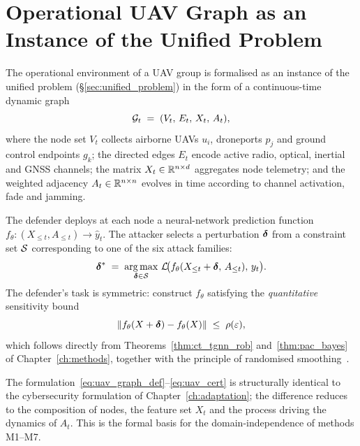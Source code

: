 \section{Operational UAV Graph as an Instance of the Unified Problem}
\label{sec:uav_graph}

The operational environment of a UAV group is formalised as an
instance of the unified problem
(\S\ref{sec:unified_problem}) in the form of a continuous-time
dynamic graph
\begin{equation}
\mathcal{G}_t \;=\; (V_t,\,E_t,\,X_t,\,A_t),
\label{eq:uav_graph_def}
\end{equation}
where the node set $V_t$ collects airborne UAVs $u_i$, droneports
$p_j$ and ground control endpoints $g_k$; the directed edges $E_t$
encode active radio, optical, inertial and GNSS channels; the matrix
$X_t \in \mathbb{R}^{n\times d}$ aggregates node telemetry; and the weighted
adjacency $A_t \in \mathbb{R}^{n\times n}$ evolves in time according to
channel activation, fade and jamming.

The defender deploys at each node a neural-network prediction
function $f_{\theta}\colon (X_{\le t},A_{\le t}) \to \hat{y}_t$. The
attacker selects a perturbation $\boldsymbol{\delta}$ from a constraint set
$\mathcal{S}$ corresponding to one of the six attack families:
\begin{equation}
\boldsymbol{\delta}^{*} \;=\; \mathop{\mathrm{arg\,max}}_{\boldsymbol{\delta}\in\mathcal{S}}\,
\mathcal{L}\!\bigl(f_{\theta}(X_{\le t}+\boldsymbol{\delta},\,A_{\le t}),\,y_t\bigr).
\label{eq:uav_adv_max}
\end{equation}
The defender's task is symmetric: construct $f_{\theta}$ satisfying
the \emph{quantitative} sensitivity bound
\begin{equation}
\left\lVert f_{\theta}(X+\boldsymbol{\delta}) - f_{\theta}(X)\right\rVert \;\le\; \rho(\varepsilon),
\label{eq:uav_cert}
\end{equation}
which follows directly from Theorems~\ref{thm:ct_tgnn_rob}
and~\ref{thm:pac_bayes} of Chapter~\ref{ch:methods}, together with
the principle of randomised smoothing~\cite{Cohen2019}.

The formulation~\eqref{eq:uav_graph_def}--\eqref{eq:uav_cert} is
structurally identical to the cybersecurity formulation of
Chapter~\ref{ch:adaptation}; the difference reduces to the
composition of nodes, the feature set $X_t$ and the process driving
the dynamics of $A_t$. This is the formal basis for the
domain-independence of methods \textsf{M1}--\textsf{M7}.


